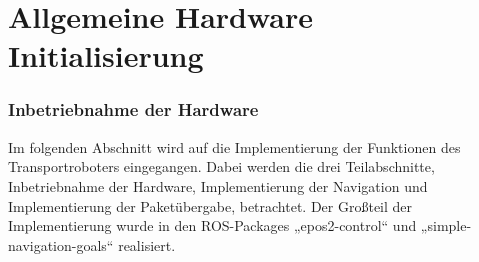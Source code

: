 \section{Allgemeine Hardware Initialisierung}

\subsubsection{Inbetriebnahme der Hardware}

Im folgenden Abschnitt wird auf die Implementierung der Funktionen des Transportroboters eingegangen. Dabei werden die drei Teilabschnitte, Inbetriebnahme der Hardware, Implementierung der Navigation und Implementierung der Paketübergabe, betrachtet. Der Großteil der Implementierung wurde in den ROS-Packages „epos2-control“ und „simple-navigation-goals“ realisiert.